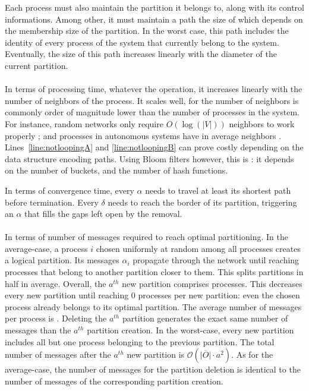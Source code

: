 \noindent Each process must also maintain the partition it belongs to,
along with its control informations. Among other, it must maintain a
path the size of which depends on the membership size of the
partition. In the worst case, this path includes the identity of every
process of the system that currently belong to the system. Eventually,
the size of this path increases linearly with the diameter of the
current partition. 

\paragraph{}
In terms of processing time, whatever the operation, it increases
linearly with the number of neighbors of the process. It scales well,
for the number of neighbors is commonly order of magnitude lower than
the number of processes in the system. For instance, random networks
only require $O(\log(|V|))$ neighbors to work properly \REF; and
processes in autonomous systems have in average  neighbors
\REF. Lines~\ref{line:notloopingA} and \ref{line:notloopingB} can
prove costly depending on the data structure encoding paths. Using
Bloom filters however, this is : it depends on the
number of buckets, and the number of hash functions.

\noindent In terms of convergence time, every $\alpha$ needs to travel
at least its shortest path before termination. Every $\delta$ needs to
reach the border of its partition, triggering an $\alpha$ that fills
the gaps left open by the removal. 

\paragraph{}
In terms of number of messages required to reach optimal
partitioning. In the average-case, a process $i$ chosen uniformly at
random among all processes creates a logical partition. Its messages
$\alpha_i$ propagate through the network until reaching processes that
belong to another partition closer to them. This splits partitions in
half in average. Overall, the $a^{th}$ new partition comprises
processes. This decreases every new partition until reaching $0$
processes per new partition: even the chosen process already belongs
to its optimal partition. The average number of messages per process
is .  Deleting the
$a^{th}$ partition generates the exact same number of messages than
the $a^{th}$ partition creation.  In the
worst-case, every new partition includes all but one process belonging
to the previous partition. The total number of messages after the
$a^{th}$ new partition is $\mathcal{O}(\overline{|O|}\cdot a^2)$. As
for the average-case, the number of messages for the partition
deletion is identical to the number of messages of the corresponding
partition creation.

\noindent {}


